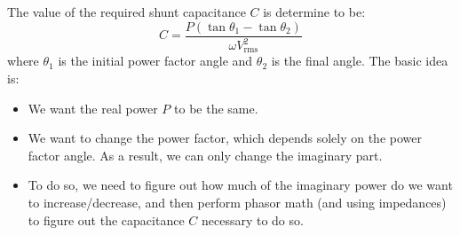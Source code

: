 \documentclass{article}
\begin{document}
The value of the required shunt capacitance $C$ is determine to be:
\begin{equation}
    C = \frac{P(\tan\theta_1-\tan\theta_2)}{\omega V_\text{rms}^2}
\end{equation}
where $\theta_1$ is the initial power factor angle and $\theta_2$ is the final angle. The basic idea is:
\begin{itemize}
    \item We want the real power $P$ to be the same.
    \item We want to change the power factor, which depends solely on the power factor angle. As a result, we can only change the imaginary part.
    \item To do so, we need to figure out how much of the imaginary power do we want to increase/decrease, and then perform phasor math (and using impedances) to figure out the capacitance $C$ necessary to do so.
\end{itemize}
\end{document}
